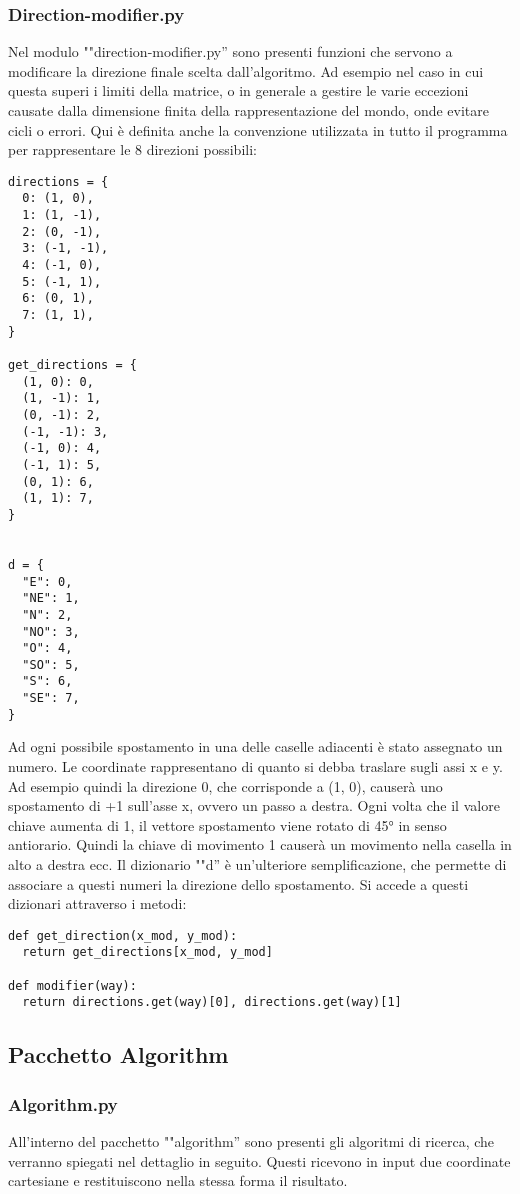 \subsubsection{Direction-modifier.py}
Nel modulo ""direction-modifier.py'' sono presenti funzioni che servono a modificare la direzione finale scelta dall'algoritmo. Ad esempio nel caso in cui questa superi i limiti della matrice, o in generale a gestire le varie eccezioni causate dalla dimensione finita della rappresentazione del mondo, onde evitare cicli o errori. Qui è definita anche la convenzione utilizzata in tutto il programma per rappresentare le 8 direzioni possibili:
\begin{verbatim}
directions = {
  0: (1, 0),
  1: (1, -1),
  2: (0, -1),
  3: (-1, -1),
  4: (-1, 0),
  5: (-1, 1),
  6: (0, 1),
  7: (1, 1),
}

get_directions = {
  (1, 0): 0,
  (1, -1): 1,
  (0, -1): 2,
  (-1, -1): 3,
  (-1, 0): 4,
  (-1, 1): 5,
  (0, 1): 6,
  (1, 1): 7,
}


d = {
  "E": 0,
  "NE": 1,
  "N": 2,
  "NO": 3,
  "O": 4,
  "SO": 5,
  "S": 6,
  "SE": 7,
}
\end{verbatim}

Ad ogni possibile spostamento in una delle caselle adiacenti è stato assegnato un numero. Le coordinate rappresentano di quanto si debba traslare sugli assi x e y. Ad esempio quindi la direzione 0, che corrisponde a (1, 0), causerà uno spostamento di +1 sull'asse x, ovvero un passo a destra. Ogni volta che il valore chiave aumenta di 1, il vettore spostamento viene rotato di 45° in senso antiorario. Quindi la chiave di movimento 1 causerà un movimento nella casella in alto a destra ecc. Il dizionario ""d'' è un'ulteriore semplificazione, che permette di associare a questi numeri la direzione dello spostamento. Si accede a questi dizionari attraverso i metodi:
\begin{verbatim}
def get_direction(x_mod, y_mod):
  return get_directions[x_mod, y_mod]

def modifier(way):
  return directions.get(way)[0], directions.get(way)[1]

\end{verbatim}

\subsection{Pacchetto Algorithm}

\subsubsection{Algorithm.py}
All'interno del pacchetto ""algorithm'' sono presenti gli algoritmi di ricerca, che verranno spiegati nel dettaglio in seguito. Questi ricevono in input due coordinate cartesiane e restituiscono nella stessa forma il risultato.
	
